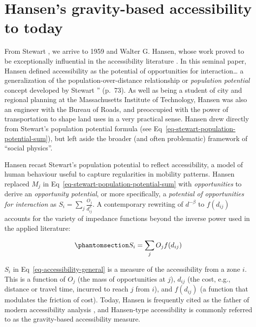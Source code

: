 \documentclass[
  10pt,
  letterpaper,
]{article}
\begin{document}
\section{Hansen's gravity-based accessibility to
today}\label{grav-to-today}

From Stewart \citep{stewartDemographicGravitationEvidence1948}, we
arrive to 1959 and Walter G. Hansen, whose work proved to be
exceptionally influential in the accessibility literature
\citep{hansen1959}. In this seminal paper, Hansen defined accessibility
as the potential of opportunities for interaction\ldots{} a
generalization of the population-over-distance relationship or
\emph{population potential} concept developed by Stewart
\citep{stewartDemographicGravitationEvidence1948}'' (p.~73). As well as
being a student of city and regional planning at the Massachusetts
Institute of Technology, Hansen was also an engineer with the Bureau of
Roads, and preoccupied with the power of transportation to shape land
uses in a very practical sense. Hansen \citep{hansen1959} drew directly
from Stewart's population potential formula (see
Eq~\ref{eq-stewart-population-potential-sum}), but left aside the
broader (and often problematic) framework of ``social physics''.

Hansen recast Stewart's population potential to reflect accessibility, a
model of human behaviour useful to capture regularities in mobility
patterns. Hansen replaced \(M_j\) in
Eq~\ref{eq-stewart-population-potential-sum} with \emph{opportunities}
to derive an \emph{opportunity potential}, or more specifically, a
\emph{potential of opportunities for interaction} as
\(S_{i} = \sum_j \frac{O_j }{d_{ij}^\beta}\). A contemporary rewriting
of \(d^{-\beta}\) to \(f(d_{ij})\) accounts for the variety of impedance
functions beyond the inverse power used in the applied literature:

\begin{equation}\phantomsection\label{eq-accessibility-general}{
S_{i} = \sum_j O_j  f(d_{ij})
}\end{equation}

\(S_{i}\) in Eq~\ref{eq-accessibility-general} is a measure of the
accessibility from a zone \(i\). This is a function of \(O_j\) (the mass
of opportunities at \(j\)), \(d_{ij}\) (the cost, e.g., distance or
travel time, incurred to reach \(j\) from \(i\)), and \(f(d_{ij})\) (a
function that modulates the friction of cost). Today, Hansen is
frequently cited as the father of modern accessibility analysis
\citep[e.g.,][]{reggianiGuestEditorialNew2011}, and Hansen-type
accessibility is commonly referred to as the gravity-based accessibility
measure.
\end{document}
